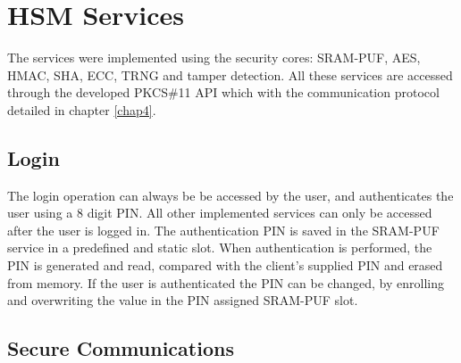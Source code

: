 
\section{HSM Services}\label{chap:implementation:services}

The services were implemented using the security cores: SRAM-PUF, AES, HMAC, SHA, ECC, TRNG and tamper detection.
All these services are accessed through the developed PKCS\#11 API which with the communication protocol detailed in chapter \ref{chap4}.

\subsection{Login}\label{chap:implementation:services:authentication}

The login operation can always be be accessed by the user, and authenticates the user using a 8 digit PIN. All other implemented services can only be accessed after the user is logged in.
The authentication PIN is saved in the SRAM-PUF service in a predefined and static slot. When authentication is performed, the PIN is generated and read, compared with the client's supplied PIN and erased from memory.
If the user is authenticated the PIN can be changed, by enrolling and overwriting the value in the PIN assigned SRAM-PUF slot.

\subsection{Secure Communications}\label{chap:implementation:services:secure}

